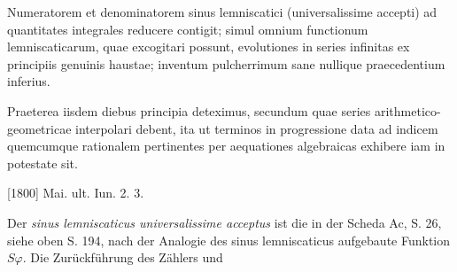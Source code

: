 \indent Numeratorem et denominatorem sinus lemniscatici (universalissime accepti) ad quantitates integrales reducere contigit; simul omnium functionum lemniscaticarum, quae excogitari possunt, evolutiones in series infinitas ex principiis genuinis haustae; inventum pulcherrimum sane nullique praecedentium inferius.
\par\indent Praeterea iisdem diebus principia deteximus, secundum quae series arithmetico-geometricae interpolari debent, ita ut terminos in progressione data ad indicem quemcumque rationalem pertinentes per aequationes algebraicas exhibere iam in potestate sit.
\par\noindent\hfill[1800] Mai. ult. Iun. 2. 3.

\medskip\begingroup\small
\indent Der \textit{sinus lemniscaticus universalissime acceptus} ist die in der Scheda Ac, S. 26, siehe oben S. 194, nach der Analogie des sinus lemniscaticus aufgebaute Funktion \(S\varphi\). Die Zurückführung des Zählers und
\par\endgroup

